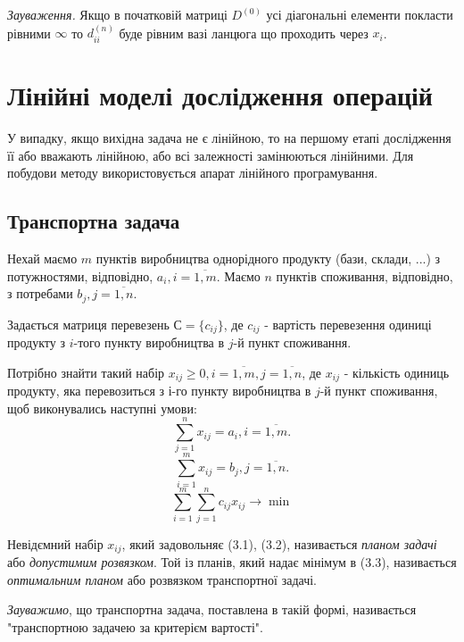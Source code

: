 \documentclass[12pt,a4paper]{book}
\begin{document}
\emph{Зауваження.} Якщо в початковій матриці $D^{(0)}$ усі діагональні елементи покласти рівними $\infty$ то $d_{ii}^{(n)}$ буде рівним вазі ланцюга що проходить через $x_i$.

\chapter{Лінійні моделі дослідження операцій}

У випадку, якщо вихідна задача не є лінійною, то на першому етапі дослідження її або вважають лінійною, або всі залежності замінюються лінійними. Для побудови методу використовується апарат лінійного програмування.

\section{Транспортна задача}

Нехай маємо $m$ пунктів виробництва однорідного продукту (бази, склади, ...) з потужностями, відповідно, $a_i, i = \overline{1, m}$. Маємо $n$ пунктів споживання, відповідно, з потребами $b_j, j =\overline{1, n}$.

Задається матриця перевезень $С = \{c_{ij}\}$, де $c_{ij}$ - вартість перевезення одиниці продукту з $i$-того пункту виробництва в $j$-й пункт споживання.

Потрібно знайти такий набір $x_{ij} \geq 0, i = \overline{1, m}, j = \overline{1, n}$, де  $x_{ij}$ - кількість одиниць продукту, яка перевозиться з $і$-го пункту виробництва в $j$-й пункт споживання, щоб виконувались наступні умови: 
\begin{equation}  \sum_{j=1}^n x_{ij} = a_i, i = \overline{1, m}. \end{equation}
\begin{equation} \sum_{i=1}^m x_{ij} = b_j, j = \overline{1, n}.   \end{equation}
\begin{equation} \sum_{i=1}^m \sum_{j=1}^n c_{ij} x_{ij} \to \min  \end{equation}

Невідємний набір $x_{ij}$, який задовольняє (3.1), (3.2), називається \emph{планом задачі} або \emph{допустимим розвязком}. Той із планів, який надає мінімум в (3.3), називається \emph{оптимальним планом} або розвязком транспортної задачі.

\emph{Зауважимо}, що транспортна задача, поставлена в такій формі, називається "транспортною задачею за критерієм вартості".
\end{document}
